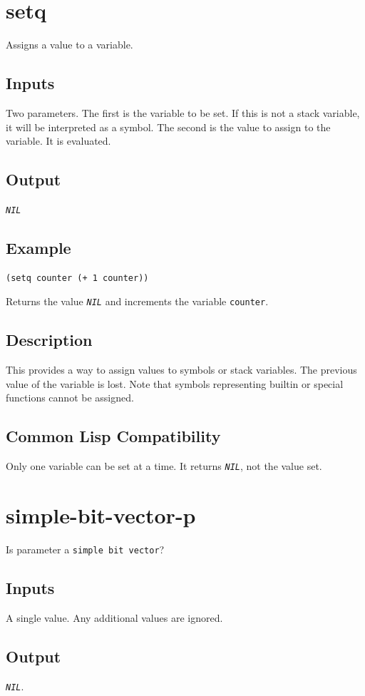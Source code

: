 \documentclass[10pt, openany]{book}
\newcommand{\constant}[1]{\emph{\texttt{#1}}}
\newcommand{\keyword}[1]{\texttt{#1}}
\newcommand{\datatype}[1]{\texttt{#1}}
\begin{document}
\section{setq}
Assigns a value to a variable.
\subsection{Inputs}
Two parameters.  The first is the variable to be set.  If this is not a stack variable, it will be interpreted as a symbol.  The second is the value to assign to the variable.  It is evaluated.
\subsection{Output}
\constant{NIL}
\subsection{Example}
\begin{lstlisting}
(setq counter (+ 1 counter))
\end{lstlisting}
Returns the value \constant{NIL} and increments the variable \keyword{counter}.
\subsection{Description}
This provides a way to assign values to symbols or stack variables.  The previous value of the variable is lost.  Note that symbols representing builtin or special functions cannot be assigned.
\subsection{Common Lisp Compatibility}
Only one variable can be set at a time.  It returns \constant{NIL}, not the value set.

\section{simple-bit-vector-p}
Is parameter a \datatype{simple bit vector}?
\subsection{Inputs}
A single value.  Any additional values are ignored.
\subsection{Output}
\constant{NIL}.
\end{document}
